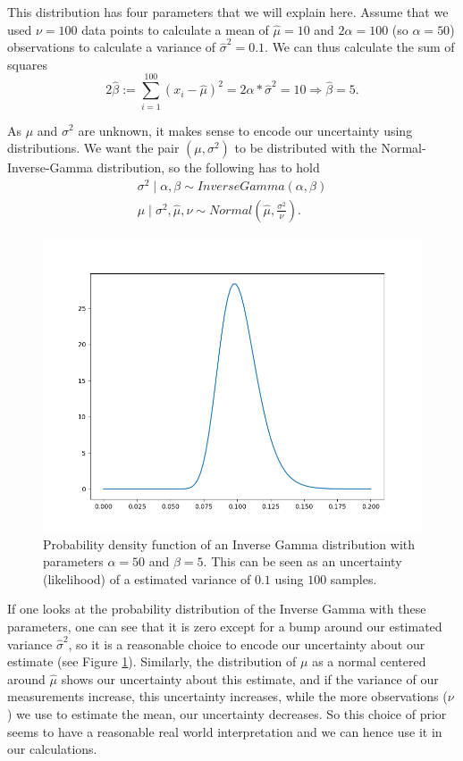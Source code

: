 \documentclass[12pt,a4paper]{article}
\begin{document}
This distribution has four parameters that we will explain here. Assume that we used $\nu=100$ data points to calculate a mean of $\hat\mu=10$ and $2\alpha=100$ (so $\alpha=50$) observations to calculate a variance of $\hat\sigma^2=0.1$. We can thus calculate the sum of squares~$$2\hat\beta := \sum_{i=1}^{100} (x_i - \hat\mu)^2=2\alpha*\hat\sigma^2=10 \Rightarrow \hat\beta=5.$$

As $\mu$ and $\sigma^2$ are unknown, it makes sense to encode our uncertainty using distributions. We want the pair $(\mu, \sigma^2)$ to be distributed with the Normal-Inverse-Gamma distribution, so the following has to hold
\begin{gather*}
	\sigma^2 \mid \alpha, \beta \sim InverseGamma(\alpha, \beta) \\ 
	\mu \mid \sigma^2, \hat\mu, \nu \sim Normal(\hat\mu, \frac{\sigma^2}{\nu}).
\end{gather*}

\begin{figure}
	\centering
	\includegraphics{images/invgamma_example.png}
	\caption{Probability density function of an Inverse Gamma distribution with parameters $\alpha=50$ and $\beta=5$. This can be seen as an uncertainty (likelihood) of a estimated variance of $0.1$ using $100$ samples.}
	\label{fig:invgamma_example}
\end{figure}

If one looks at the probability distribution of the Inverse Gamma with these parameters, one can see that it is zero except for a bump around our estimated variance $\hat\sigma^2$, so it is a reasonable choice to encode our uncertainty about our estimate (see Figure \ref{fig:invgamma_example}). Similarly, the distribution of $\mu$ as a normal centered around $\hat\mu$ shows our uncertainty about this estimate, and if the variance of our measurements increase, this uncertainty increases, while the more observations ($\nu$) we use to estimate the mean, our uncertainty decreases. So this choice of prior seems to have a reasonable real world interpretation and we can hence use it in our calculations.
\end{document}
